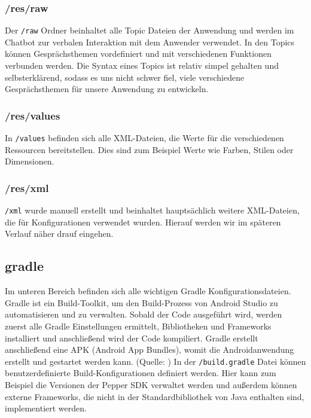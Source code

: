 \subsubsection*{/res/raw}
Der \verb|/raw| Ordner beinhaltet alle Topic Dateien der Anwendung und werden im Chatbot zur verbalen Interaktion mit dem Anwender verwendet. In den Topics können Gesprächsthemen vordefiniert und mit verschiedenen Funktionen verbunden werden. Die Syntax eines Topics ist relativ simpel gehalten und selbsterklärend, sodass es uns nicht schwer fiel, viele verschiedene Gesprächsthemen für unsere Anwendung zu entwickeln. \\

\subsubsection*{/res/values}
In \verb|/values| befinden sich alle XML-Dateien, die Werte für die verschiedenen Ressourcen bereitstellen. Dies sind zum Beispiel Werte wie Farben, Stilen oder Dimensionen.\\

\subsubsection*{/res/xml}
\verb|/xml| wurde manuell erstellt und beinhaltet hauptsächlich weitere XML-Dateien, die für Konfigurationen verwendet wurden. Hierauf werden wir im späteren Verlauf näher drauf eingehen. \\

\subsection*{gradle}
Im unteren Bereich befinden sich alle wichtigen Gradle Konfigurationsdateien. Gradle ist ein Build-Toolkit, um den Build-Prozess von Android Studio zu automatisieren und zu verwalten. Sobald der Code ausgeführt wird, werden zuerst alle Gradle Einstellungen ermittelt, Bibliotheken und Frameworks installiert und anschließend wird der Code kompiliert. Gradle erstellt anschließend eine APK (Android App Bundles), womit die Androidanwendung erstellt und gestartet werden kann. (Quelle: \cite{Gradle})
In der \verb|/build.gradle| Datei können benutzerdefinierte Build-Konfigurationen definiert werden. Hier kann zum Beispiel die Versionen der Pepper SDK verwaltet werden und außerdem können externe Frameworks, die nicht in der Standardbibliothek von Java enthalten sind, implementiert werden.\\

